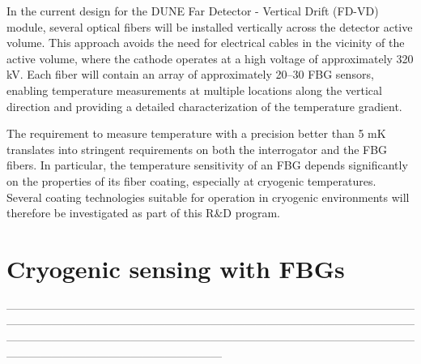 \documentclass[preprint,11pt]{elsarticle}
\begin{document}
In the current design for the DUNE Far Detector - Vertical Drift (FD-VD) module, several optical fibers will be installed vertically across the detector active volume. This approach avoids the need for electrical cables in the vicinity of the active volume, where the cathode operates at a high voltage of approximately 320 kV. Each fiber will contain an array of approximately 20–30 FBG sensors, enabling temperature measurements at multiple locations along the vertical direction and providing a detailed characterization of the temperature gradient.

The requirement to measure temperature with a precision better than 5 mK translates into stringent requirements on both the interrogator and the FBG fibers. In particular, the temperature sensitivity of an FBG depends significantly on the properties of its fiber coating, especially at cryogenic temperatures. Several coating technologies suitable for operation in cryogenic environments will therefore be investigated as part of this R\&D program.



\section{Cryogenic sensing with FBGs}
\label{sec:fbgs}


---------------------------------------------------------------------------------------------------------------------------------------------------------------------------------------------------------------------------------------------------------------------------------------------------------------------------------------------------------------------------------------------
\end{document}
